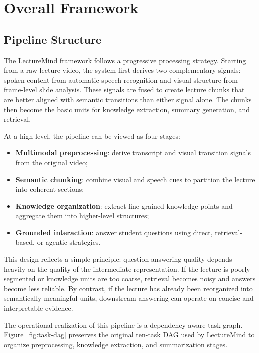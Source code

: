 \section{Overall Framework}

\subsection{Pipeline Structure}

The LectureMind framework follows a progressive processing strategy. Starting from a raw lecture video, the system first derives two complementary signals: spoken content from automatic speech recognition and visual structure from frame-level slide analysis. These signals are fused to create lecture chunks that are better aligned with semantic transitions than either signal alone. The chunks then become the basic units for knowledge extraction, summary generation, and retrieval.

At a high level, the pipeline can be viewed as four stages:

\begin{itemize}
\item \textbf{Multimodal preprocessing}: derive transcript and visual transition signals from the original video;
\item \textbf{Semantic chunking}: combine visual and speech cues to partition the lecture into coherent sections;
\item \textbf{Knowledge organization}: extract fine-grained knowledge points and aggregate them into higher-level structures;
\item \textbf{Grounded interaction}: answer student questions using direct, retrieval-based, or agentic strategies.
\end{itemize}

This design reflects a simple principle: question answering quality depends heavily on the quality of the intermediate representation. If the lecture is poorly segmented or knowledge units are too coarse, retrieval becomes noisy and answers become less reliable. By contrast, if the lecture has already been reorganized into semantically meaningful units, downstream answering can operate on concise and interpretable evidence.

The operational realization of this pipeline is a dependency-aware task graph. Figure~\ref{fig:task-dag} preserves the original ten-task DAG used by LectureMind to organize preprocessing, knowledge extraction, and summarization stages.


